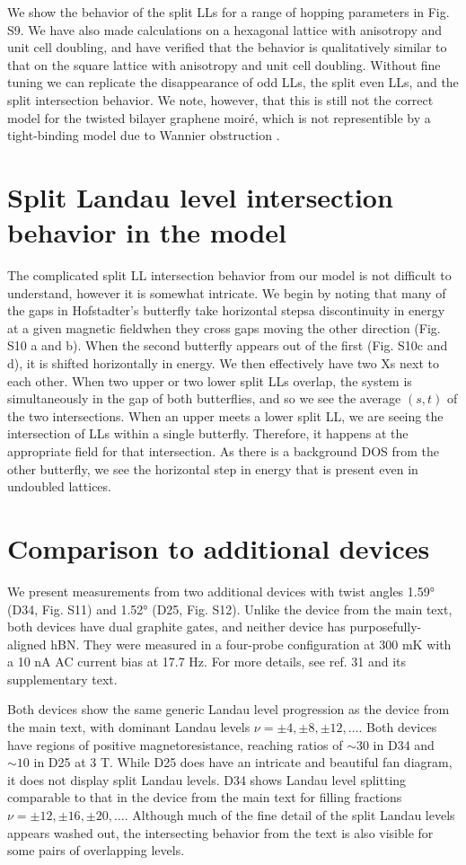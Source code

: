 \documentclass[12pt,twocolumn]{article}
\begin{document}
We show the behavior of the split LLs for a range of hopping parameters in Fig. S9. We have also made calculations on a hexagonal lattice with anisotropy and unit cell doubling, and have verified that the behavior is qualitatively similar to that on the square lattice with anisotropy and unit cell doubling. Without fine tuning we can replicate the disappearance of odd LLs, the split even LLs, and the split intersection behavior. We note, however, that this is still not the correct model for the twisted bilayer graphene moiré, which is not representible by a tight-binding model due to Wannier obstruction \cite{zouBandStructureTwisted2018}.

\section{Split Landau level intersection behavior in the model}
The complicated split LL intersection behavior from our model is not difficult to understand, however it is somewhat intricate. We begin by noting that many of the gaps in Hofstadter’s butterfly take horizontal steps\textemdash a discontinuity in energy at a given magnetic field\textemdash when they cross gaps moving the other direction (Fig. S10 a and b). When the second butterfly appears out of the first (Fig. S10c and d), it is shifted horizontally in energy. We then effectively have two Xs next to each other. When two upper or two lower split LLs overlap, the system is simultaneously in the gap of both butterflies, and so we see the average $(s, t)$ of the two intersections. When an upper meets a lower split LL, we are seeing the intersection of LLs within a single butterfly. Therefore, it happens at the appropriate field for that intersection. As there is a background DOS from the other butterfly, we see the horizontal step in energy that is present even in undoubled lattices.

\section{Comparison to additional devices}
We present measurements from two additional devices with twist angles 1.59° (D34, Fig. S11) and 1.52° (D25, Fig. S12). Unlike the device from the main text, both devices have dual graphite gates, and neither device has purposefully-aligned hBN. They were measured in a four-probe configuration at 300 mK with a 10 nA AC current bias at 17.7 Hz. For more details, see ref. 31 and its supplementary text.

Both devices show the same generic Landau level progression as the device from the main text, with dominant Landau levels $\nu = \pm 4, \pm 8, \pm 12, …$. Both devices have regions of  positive magnetoresistance, reaching ratios of $\sim 30$ in D34 and $\sim 10$ in D25 at 3 T. While D25 does have an intricate and beautiful fan diagram, it does not display split Landau levels. D34 shows Landau level splitting comparable to that in the device from the main text for filling fractions $\nu = \pm 12, \pm 16, \pm 20, …$. Although much of the fine detail of the split Landau levels appears washed out, the intersecting behavior from the text is also visible for some pairs of overlapping levels.
\end{document}
